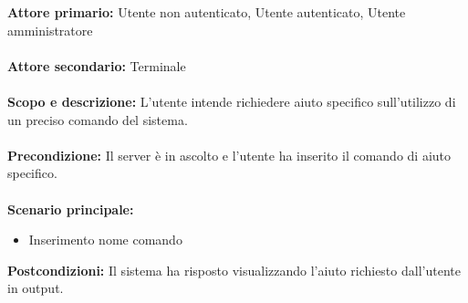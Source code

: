 \documentclass{scalatekids-article}
\begin{document}
\textbf{Attore primario:} Utente non autenticato, Utente autenticato, Utente amministratore\\ \\
\textbf{Attore secondario:} Terminale\\ \\
\textbf{Scopo e descrizione:} L'utente intende richiedere aiuto specifico sull'utilizzo di un preciso comando del sistema.\\ \\
\textbf{Precondizione:} Il server è in ascolto e l'utente ha inserito il comando di aiuto specifico.\\ \\
\textbf{Scenario principale:}
\begin{itemize}
  \item Inserimento nome comando %
\end{itemize}
\textbf{Postcondizioni:} Il sistema ha risposto visualizzando l'aiuto richiesto dall'utente in output.
\end{document}
